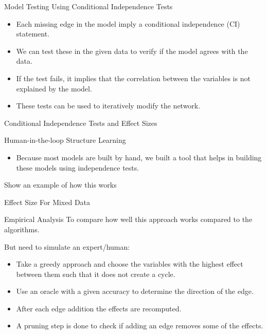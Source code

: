 \documentclass{beamer}
\begin{document}
\begin{frame}{Model Testing Using Conditional Independence Tests}

	\begin{itemize}
		\item Each missing edge in the model imply a conditional independence (CI) statement. 
		\item We can test these in the given data to verify if the model agrees with the data.
		\item If the test fails, it implies that the correlation between the variables is not explained by the model.
		\item These tests can be used to iteratively modify the network.
	\end{itemize}
\end{frame}

\begin{frame}{Conditional Independence Tests and Effect Sizes}
\end{frame}

\begin{frame}{Human-in-the-loop Structure Learning}
	\begin{itemize}
		\item Because most models are built by hand, we built a tool that helps in building these models using independence tests.
	\end{itemize}
\end{frame}

\begin{frame}{Show an example of how this works}
\end{frame}

\begin{frame}{Effect Size For Mixed Data}
\end{frame}

\begin{frame}{Empirical Analysis}
	To compare how well this approach works compared to the algorithms.

	But need to simulate an expert/human:
	\begin{itemize}
		\item Take a greedy approach and choose the variables with the highest effect between them such that it does not create a cycle.
		\item Use an oracle with a given accuracy to determine the direction of the edge.
		\item After each edge addition the effects are recomputed.
		\item A pruning step is done to check if adding an edge removes some of the effects.
	\end{itemize}
\end{frame}
\end{document}
